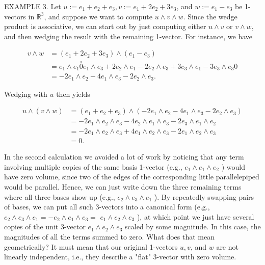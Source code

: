 \documentclass[10pt]{article}
\begin{document}
EXAMPLE 3. Let $u:=e_{1}+e_{2}+e_{3}, v:=e_{1}+2 e_{2}+3 e_{3}$, and $w:=e_{1}-e_{3}$ be 1-vectors in $\mathbb{R}^{3}$, and suppose we want to compute $u \wedge v \wedge w$. Since the wedge product is associative, we can start out by just computing either $u \wedge v$ or $v \wedge w$, and then wedging the result with the remaining 1-vector. For instance, we have

$$
\begin{aligned}
v \wedge w & =\left(e_{1}+2 e_{2}+3 e_{3}\right) \wedge\left(e_{1}-e_{3}\right) \\
& =e_{1} \wedge e_{1} \stackrel{\circ}{0} e_{1} \wedge e_{3}+2 e_{2} \wedge e_{1}-2 e_{2} \wedge e_{3}+3 e_{3} \wedge e_{1}-3 e_{3} \wedge e_{3} 0 \\
& =-2 e_{1} \wedge e_{2}-4 e_{1} \wedge e_{3}-2 e_{2} \wedge e_{3} .
\end{aligned}
$$

Wedging with $u$ then yields

$$
\begin{aligned}
u \wedge(v \wedge w) & =\left(e_{1}+e_{2}+e_{3}\right) \wedge\left(-2 e_{1} \wedge e_{2}-4 e_{1} \wedge e_{3}-2 e_{2} \wedge e_{3}\right) \\
& =-2 e_{1} \wedge e_{2} \wedge e_{3}-4 e_{2} \wedge e_{1} \wedge e_{3}-2 e_{3} \wedge e_{1} \wedge e_{2} \\
& =-2 e_{1} \wedge e_{2} \wedge e_{3}+4 e_{1} \wedge e_{2} \wedge e_{3}-2 e_{1} \wedge e_{2} \wedge e_{3} \\
& =0 .
\end{aligned}
$$

In the second calculation we avoided a lot of work by noticing that any term involving multiple copies of the same basis 1-vector (e.g., $e_{1} \wedge e_{1} \wedge e_{2}$ ) would have zero volume, since two of the edges of the corresponding little parallelepiped would be parallel. Hence, we can just write down the three remaining terms where all three bases show up (e.g., $e_{2} \wedge e_{3} \wedge e_{1}$ ). By repeatedly swapping pairs of bases, we can put all such 3-vectors into a canonical form (e.g., $e_{2} \wedge e_{3} \wedge e_{1}=-e_{2} \wedge e_{1} \wedge e_{3}=$ $e_{1} \wedge e_{2} \wedge e_{3}$ ), at which point we just have several copies of the unit 3-vector $e_{1} \wedge e_{2} \wedge e_{3}$ scaled by some magnitude. In this case, the magnitudes of all the terms summed to zero. What does that mean geometrically? It must mean that our original 1-vectors $u, v$, and $w$ are not linearly independent, i.e., they describe a "flat" 3-vector with zero volume.
\end{document}

